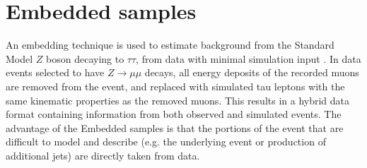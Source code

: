 
\section{Embedded samples}
\label{sec:embedded-samples}
An embedding technique is used to estimate background from the Standard Model $Z$ boson decaying to $\tau\tau$, from data with minimal simulation input \cite{CMS-TAU-18-001}. In data events selected to have $Z \rightarrow \mu\mu$ decays, all energy deposits of the recorded muons are removed from the event, and replaced with simulated tau leptons with the same kinematic properties as the removed muons. This results in a hybrid data format containing information from both observed and simulated events. The advantage of the Embedded samples is that the portions of the event that are difficult to model and describe (e.g. the underlying event or production of additional jets) are directly taken from data. 


